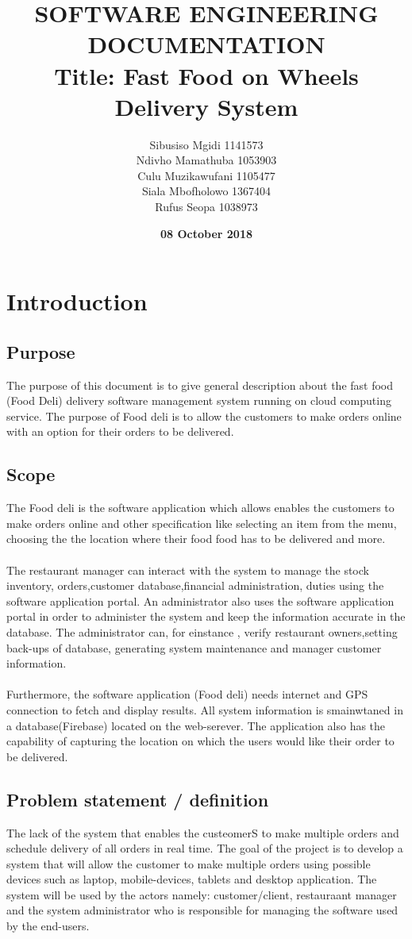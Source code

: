 \documentclass[12pt]{article}
\title{\textbf{SOFTWARE ENGINEERING\\ DOCUMENTATION \\Title: Fast Food on Wheels Delivery System}}
\author{\Large Sibusiso Mgidi 1141573\\
		\Large Ndivho Mamathuba 1053903\\
		\Large Culu Muzikawufani 1105477\\	
		\Large Siala Mbofholowo 1367404\\
		\Large Rufus Seopa 1038973\\
}
\date{\textbf{\Large 08 October 2018}}
\begin{document}
\linespread{1.5}
\maketitle{\textbf{\Large }}
\newpage
\tableofcontents
\newpage
\section{Introduction}

\subsection{Purpose}
The purpose of this document is to give general description about the fast food (Food Deli) delivery software management system running on cloud computing service. The purpose of Food deli is to allow the customers to make orders online with an option for their orders to be delivered.

\subsection{Scope}
The Food deli is the software application which allows enables the customers to make orders online and other specification like selecting an item from the menu, choosing the the location where their food food has to be delivered and more.\\
\\
The restaurant manager can interact with the system to manage the stock inventory, orders,customer database,financial administration, duties using the software application portal. An administrator also uses the software application portal in order to administer the system and keep the information accurate in the database. The administrator can, for einstance , verify restaurant owners,setting back-ups of database, generating system maintenance and manager customer information.\\
\\
Furthermore, the software application (Food deli) needs internet and GPS connection to fetch and display results. All system information is smainwtaned in a database(Firebase) located on the web-serever. The application also has the capability of capturing the location on which the users would like their order to be delivered.  

\subsection{Problem statement / definition}
The lack of the system that enables the custeomerS to make multiple orders and schedule delivery of all orders in real time. The goal of the project is to develop a system that will allow the customer to make multiple orders using possible devices such as laptop, mobile-devices, tablets and desktop application. The system will be used by the actors namely: customer/client, restauraant manager and the system administrator who is responsible for managing the software used by the end-users. 
\end{document}
